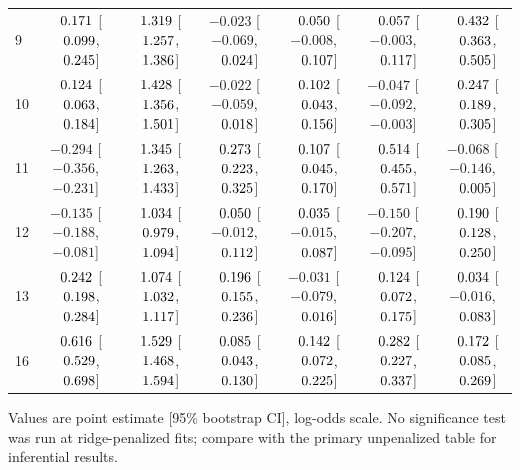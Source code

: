 \begin{table}[htbp]
{\begin{tabular}{lcccccc}
9 & $\hphantom{-}0.171$ [$\hphantom{-}0.099$, $\hphantom{-}0.245$] & $\hphantom{-}1.319$ [$\hphantom{-}1.257$, $\hphantom{-}1.386$] & $-0.023$ [$-0.069$, $\hphantom{-}0.024$] & $\hphantom{-}0.050$ [$-0.008$, $\hphantom{-}0.107$] & $\hphantom{-}0.057$ [$-0.003$, $\hphantom{-}0.117$] & $\hphantom{-}0.432$ [$\hphantom{-}0.363$, $\hphantom{-}0.505$] \\
10 & $\hphantom{-}0.124$ [$\hphantom{-}0.063$, $\hphantom{-}0.184$] & $\hphantom{-}1.428$ [$\hphantom{-}1.356$, $\hphantom{-}1.501$] & $-0.022$ [$-0.059$, $\hphantom{-}0.018$] & $\hphantom{-}0.102$ [$\hphantom{-}0.043$, $\hphantom{-}0.156$] & $-0.047$ [$-0.092$, $-0.003$] & $\hphantom{-}0.247$ [$\hphantom{-}0.189$, $\hphantom{-}0.305$] \\
11 & $-0.294$ [$-0.356$, $-0.231$] & $\hphantom{-}1.345$ [$\hphantom{-}1.263$, $\hphantom{-}1.433$] & $\hphantom{-}0.273$ [$\hphantom{-}0.223$, $\hphantom{-}0.325$] & $\hphantom{-}0.107$ [$\hphantom{-}0.045$, $\hphantom{-}0.170$] & $\hphantom{-}0.514$ [$\hphantom{-}0.455$, $\hphantom{-}0.571$] & $-0.068$ [$-0.146$, $\hphantom{-}0.005$] \\
12 & $-0.135$ [$-0.188$, $-0.081$] & $\hphantom{-}1.034$ [$\hphantom{-}0.979$, $\hphantom{-}1.094$] & $\hphantom{-}0.050$ [$-0.012$, $\hphantom{-}0.112$] & $\hphantom{-}0.035$ [$-0.015$, $\hphantom{-}0.087$] & $-0.150$ [$-0.207$, $-0.095$] & $\hphantom{-}0.190$ [$\hphantom{-}0.128$, $\hphantom{-}0.250$] \\
13 & $\hphantom{-}0.242$ [$\hphantom{-}0.198$, $\hphantom{-}0.284$] & $\hphantom{-}1.074$ [$\hphantom{-}1.032$, $\hphantom{-}1.117$] & $\hphantom{-}0.196$ [$\hphantom{-}0.155$, $\hphantom{-}0.236$] & $-0.031$ [$-0.079$, $\hphantom{-}0.016$] & $\hphantom{-}0.124$ [$\hphantom{-}0.072$, $\hphantom{-}0.175$] & $\hphantom{-}0.034$ [$-0.016$, $\hphantom{-}0.083$] \\
16 & $\hphantom{-}0.616$ [$\hphantom{-}0.529$, $\hphantom{-}0.698$] & $\hphantom{-}1.529$ [$\hphantom{-}1.468$, $\hphantom{-}1.594$] & $\hphantom{-}0.085$ [$\hphantom{-}0.043$, $\hphantom{-}0.130$] & $\hphantom{-}0.142$ [$\hphantom{-}0.072$, $\hphantom{-}0.225$] & $\hphantom{-}0.282$ [$\hphantom{-}0.227$, $\hphantom{-}0.337$] & $\hphantom{-}0.172$ [$\hphantom{-}0.085$, $\hphantom{-}0.269$] \\
\bottomrule
\end{tabular}
}
\vspace{4pt}
\par\noindent
\begin{minipage}{\linewidth}\small Values are point estimate [95\% bootstrap CI], log-odds scale. No significance test was run at ridge-penalized fits; compare with the primary unpenalized table for inferential results.\end{minipage}
\end{table}

